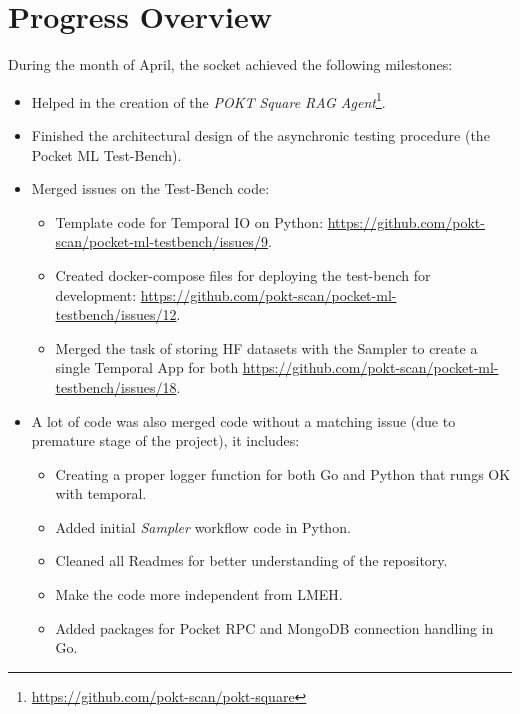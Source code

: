 \section{Progress Overview}\label{sec:a}

During the month of April, the socket achieved the following milestones:

\begin{itemize}
    \item Helped in the creation of the \emph{POKT Square RAG Agent}\footnote{\url{https://github.com/pokt-scan/pokt-square}}.
    \item Finished the architectural design of the asynchronic testing procedure (the Pocket \gls{ML} Test-Bench).
    \item Merged issues on the Test-Bench code:
    \begin{itemize}
        \item Template code for Temporal IO on Python: \url{https://github.com/pokt-scan/pocket-ml-testbench/issues/9}.
        \item Created docker-compose files for deploying the test-bench for development: \url{https://github.com/pokt-scan/pocket-ml-testbench/issues/12}.
        \item Merged the task of storing \gls{HF} datasets with the Sampler to create a single Temporal App for both \url{https://github.com/pokt-scan/pocket-ml-testbench/issues/18}.
    \end{itemize}
    \item A lot of code was also merged code without a matching issue (due to premature stage of the project), it includes:
    \begin{itemize}
        \item Creating a proper logger function for both Go and Python that rungs OK with temporal.
        \item Added initial \emph{Sampler} workflow code in Python.
        \item Cleaned all Readmes for better understanding of the repository.
        \item Make the code more independent from \gls{LMEH}.
        \item Added packages for Pocket RPC and MongoDB connection handling in Go.
    \end{itemize}
\end{itemize}

